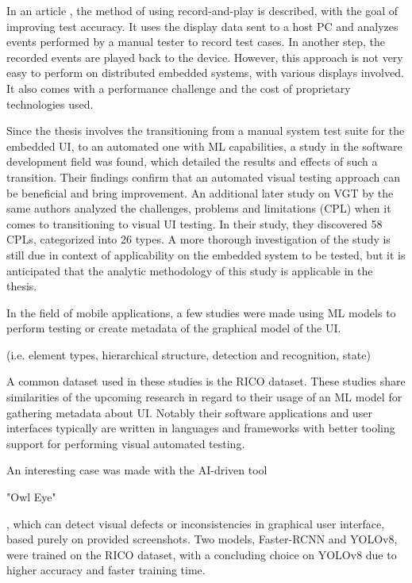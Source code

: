 \documentclass[Proposal,BIC,english,IEEE]{BASE/twbook} %
\begin{document}
In an article \autocite{linImprovingAccuracyAutomated2014}, the method of using record-and-play is described, with the goal of improving test accuracy. It uses the display data sent to a host PC and analyzes events performed by a manual tester to record test cases. In another step, the recorded events are played back to the device. However, this approach is not very easy to perform on distributed embedded systems, with various displays involved. It also comes with a performance challenge and the cost of proprietary technologies used.

Since the thesis involves the transitioning from a manual system test suite for the embedded UI, to an automated one with ML capabilities, a study in the software development field \autocite{alegrothTransitioningManualSystem2013} was found, which detailed the results and effects of such a transition. Their findings confirm that an automated visual testing approach can be beneficial and bring improvement.
An additional later study on VGT by the same authors \autocite{alegrothVisualGUITesting2015} analyzed the challenges, problems and limitations (CPL) when it comes to transitioning to visual UI testing. In their study, they discovered 58 CPLs, categorized into 26 types. A more thorough investigation of the study is still due in context of applicability on the embedded system to be tested, but it is anticipated that the analytic methodology of this study is applicable in the thesis.

In the field of mobile applications, a few studies were made using ML models to perform testing or create metadata of the graphical model of the UI. \begin{em}(i.e. element types, hierarchical structure, detection and recognition, state)\end{em}
\autocite{altinbasGUIElementDetection2022,chengMobileApplicationGUI2021,liWidgetCaptioningGenerating2020,selcukComparisonYOLOv5YOLOv82023,zhangDeepLearningBasedMobile2020,zhangMachineVisionbasedTesting2022, cavsakGUIComponentDetection} 

A common dataset used in these studies is the RICO dataset. \autocite{dekaRicoMobileApp2017}
These studies share similarities of the upcoming research in regard to their usage of an ML model for gathering metadata about UI. Notably their software applications and user interfaces typically are written in languages and frameworks with better tooling support for performing visual automated testing.

An interesting case was made with the AI-driven tool \begin{em}"Owl Eye"\end{em} \autocite{gamalOwlEyeAIDriven2023}, which can detect visual defects or inconsistencies in graphical user interface, based purely on provided screenshots. Two models, Faster-RCNN and YOLOv8, were trained on the RICO dataset, with a concluding choice on YOLOv8 due to higher accuracy and faster training time.
\end{document}

